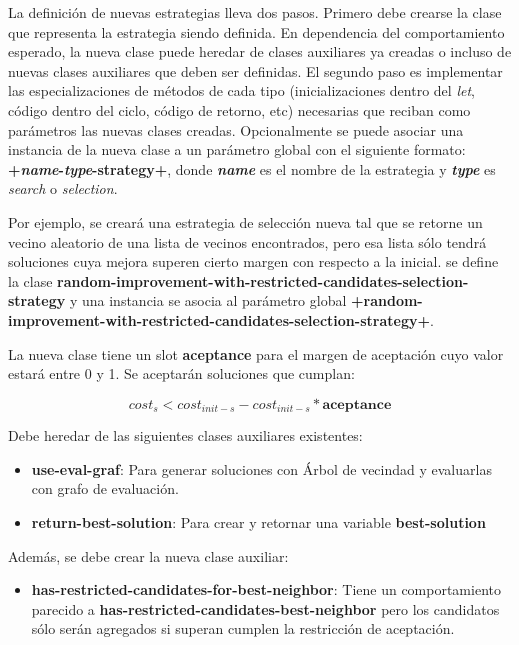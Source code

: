La definición de nuevas estrategias lleva dos pasos. Primero debe crearse la clase que representa la estrategia siendo definida. En dependencia del comportamiento esperado, la nueva clase puede heredar de clases auxiliares ya creadas o incluso de nuevas clases auxiliares que deben ser definidas. El segundo paso es implementar las especializaciones de métodos de cada tipo (inicializaciones dentro del \textit{let}, código dentro del ciclo, código de retorno, etc) necesarias que reciban como parámetros las nuevas clases creadas. Opcionalmente se puede asociar una instancia de la nueva clase a un parámetro global con el siguiente formato: \textbf{+\textit{name}-\textit{type}-strategy+}, donde \textbf{\textit{name}} es el nombre de la estrategia y \textbf{\textit{type}} es \textit{search} o \textit{selection}.


Por ejemplo, se creará una estrategia de selección nueva tal que se retorne un vecino aleatorio de una lista de vecinos encontrados, pero esa lista sólo tendrá soluciones cuya mejora superen cierto margen con respecto a la inicial. se define la clase \textbf{random-improvement-with-restricted-candidates-selection-strategy} y una instancia se asocia al parámetro global \textbf{+random-improvement-with-restricted-candidates-selection-strategy+}.

La nueva clase tiene un slot \textbf{aceptance} para el margen de aceptación cuyo valor estará entre 0 y 1. Se aceptarán soluciones que cumplan:

$$
cost_s < cost_{init-s} - cost_{init-s} * \textbf{aceptance} 
$$

Debe heredar de las siguientes clases auxiliares existentes:

\begin{itemize}
	\item \textbf{use-eval-graf}: Para generar soluciones con Árbol de vecindad y evaluarlas con grafo de evaluación.
	\item \textbf{return-best-solution}: Para crear y retornar una variable \textbf{best-solution}
\end{itemize}

Además, se debe crear la nueva clase auxiliar:

\begin{itemize}
	\item \textbf{has-restricted-candidates-for-best-neighbor}: Tiene un comportamiento parecido a \textbf{has-restricted-candidates-best-neighbor} pero los candidatos sólo serán agregados si superan cumplen la restricción de aceptación.
\end{itemize}

